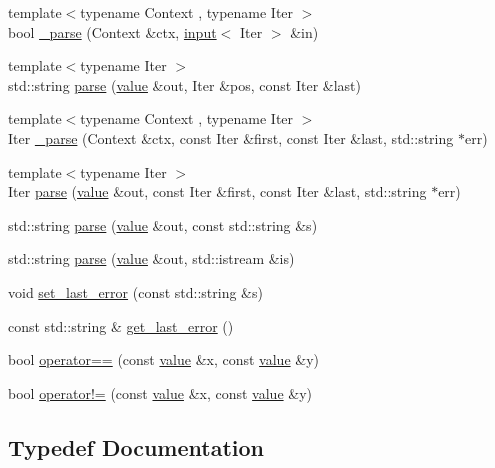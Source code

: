 \begin{DoxyCompactItemize}
\item 
{\footnotesize template$<$typename Context , typename Iter $>$ }\\bool \hyperlink{namespacepicojson_aed024a6a1c8d8982a38c4a7fcefde221}{\+\_\+parse} (Context \&ctx, \hyperlink{classpicojson_1_1input}{input}$<$ Iter $>$ \&in)
\item 
{\footnotesize template$<$typename Iter $>$ }\\std\+::string \hyperlink{namespacepicojson_a3aca598f5855bc130a92a3e08a0c6ebf}{parse} (\hyperlink{classpicojson_1_1value}{value} \&out, Iter \&pos, const Iter \&last)
\item 
{\footnotesize template$<$typename Context , typename Iter $>$ }\\Iter \hyperlink{namespacepicojson_a01c0a3f35d42282ba913375737c8e259}{\+\_\+parse} (Context \&ctx, const Iter \&first, const Iter \&last, std\+::string $\ast$err)
\item 
{\footnotesize template$<$typename Iter $>$ }\\Iter \hyperlink{namespacepicojson_a21621c03c9c8c83dcf5bc604d1cafdf6}{parse} (\hyperlink{classpicojson_1_1value}{value} \&out, const Iter \&first, const Iter \&last, std\+::string $\ast$err)
\item 
std\+::string \hyperlink{namespacepicojson_a522ebeba3ce386f1df0aba41ae3b7763}{parse} (\hyperlink{classpicojson_1_1value}{value} \&out, const std\+::string \&s)
\item 
std\+::string \hyperlink{namespacepicojson_a2ed8a3cba445c8ecbe3d6a3a3fbdabd3}{parse} (\hyperlink{classpicojson_1_1value}{value} \&out, std\+::istream \&is)
\item 
void \hyperlink{namespacepicojson_a509585c918611015ec995d4374fee4c9}{set\+\_\+last\+\_\+error} (const std\+::string \&s)
\item 
const std\+::string \& \hyperlink{namespacepicojson_a1ba78f161e46341e0c2fd705ff8b0210}{get\+\_\+last\+\_\+error} ()
\item 
bool \hyperlink{namespacepicojson_a498fde71ce35268547d93068d9a756be}{operator==} (const \hyperlink{classpicojson_1_1value}{value} \&x, const \hyperlink{classpicojson_1_1value}{value} \&y)
\item 
bool \hyperlink{namespacepicojson_ae46de1e9659b427ea359e7fc00dd3ff1}{operator!=} (const \hyperlink{classpicojson_1_1value}{value} \&x, const \hyperlink{classpicojson_1_1value}{value} \&y)
\end{DoxyCompactItemize}


\subsection{Typedef Documentation}
\hypertarget{namespacepicojson_ac1e72166adfe3d96dc58cddc7ebd536a}{}\label{namespacepicojson_ac1e72166adfe3d96dc58cddc7ebd536a} 
